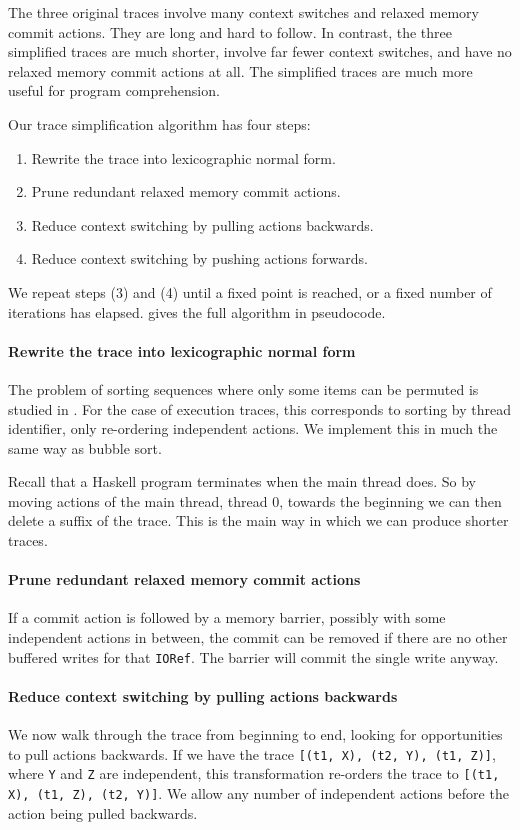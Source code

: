 The three original traces involve many context
switches and relaxed memory commit actions.  They are long and hard to
follow.  In contrast, the three simplified traces are much shorter,
involve far fewer context switches, and have no relaxed memory commit
actions at all.  The simplified traces are much more useful for
program comprehension.

Our trace simplification algorithm has four steps:

\begin{enumerate}
\item Rewrite the trace into lexicographic normal form.
\item Prune redundant relaxed memory commit actions.
\item Reduce context switching by pulling actions backwards.
\item Reduce context switching by pushing actions forwards.
\end{enumerate}

We repeat steps (3) and (4) until a fixed point is reached, or a fixed
number of iterations has elapsed.   gives the
full algorithm in pseudocode.

\paragraph{Rewrite the trace into lexicographic normal form}
The problem of sorting sequences where only some items can be permuted
is studied in \cite{anisimov1979}.  For the case of execution traces,
this corresponds to sorting by thread identifier, only re-ordering
independent actions.  We implement this in much the same way as bubble
sort.

Recall that a Haskell program terminates when the main thread does.
So by moving actions of the main thread, thread 0, towards the
beginning we can then delete a suffix of the trace.  This is the main
way in which we can produce shorter traces.

\paragraph{Prune redundant relaxed memory commit actions}
If a commit action is followed by a memory barrier, possibly with some
independent actions in between, the commit can be removed if there are
no other buffered writes for that \verb|IORef|.  The barrier will
commit the single write anyway.

\paragraph{Reduce context switching by pulling actions backwards}
We now walk through the trace from beginning to end, looking for
opportunities to pull actions backwards.  If we have the trace
\verb|[(t1, X), (t2, Y), (t1, Z)]|, where \verb|Y| and \verb|Z| are
independent, this transformation re-orders the trace to
\verb|[(t1, X), (t1, Z), (t2, Y)]|.  We allow any number of
independent actions before the action being pulled backwards.

